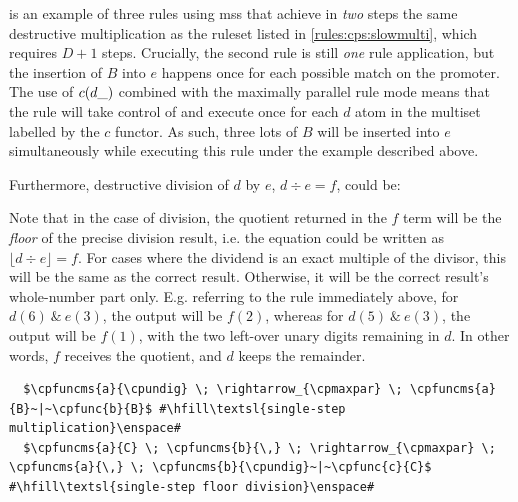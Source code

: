  is an example of three rules using \glspl{ms} that achieve in \emph{two} steps the same destructive multiplication as the \gls{ruleset} listed in \cref{rules:cps:slowmulti}, which requires \(D + 1\) steps.  Crucially, the second rule is still \emph{one} rule application, but the insertion of \(B\) into \(e\) happens once for each possible match on the promoter.  The use of \(c(d\_)\) combined with the maximally parallel rule mode means that the rule will take control of and execute once for each \(d\) atom in the multiset labelled by the \(c\) functor.  As such, three lots of \(B\) will be inserted into \(e\) simultaneously while executing this rule under the example described above.



Furthermore, destructive division of \(d\) by \(e\), \(d \div e = f\), could be:

Note that in the case of division, the quotient returned in the \(f\) term will be the \emph{floor} of the precise division result, i.e. the equation could be written as \(\lfloor d \div e \rfloor = f\).  For cases where the dividend is an exact multiple of the divisor, this will be the same as the correct result.  Otherwise, it will be the correct result's whole-number part only.  E.g. referring to the rule immediately above, for \(d(6)~\&~e(3)\), the output will be \(f(2)\), whereas for \(d(5)~\&~e(3)\), the output will be \(f(1)\), with the two left-over unary digits remaining in \(d\).  In other words, \(f\) receives the quotient, and \(d\) keeps the remainder.

\lstset{xleftmargin=.5in, xrightmargin=.5in} 
\begin{lstlisting}
  $\cpfuncms{a}{\cpundig} \; \rightarrow_{\cpmaxpar} \; \cpfuncms{a}{B}~|~\cpfunc{b}{B}$ #\hfill\textsl{single-step multiplication}\enspace#
  $\cpfuncms{a}{C} \; \cpfuncms{b}{\,} \; \rightarrow_{\cpmaxpar} \; \cpfuncms{a}{\,} \; \cpfuncms{b}{\cpundig}~|~\cpfunc{c}{C}$ #\hfill\textsl{single-step floor division}\enspace#
\end{lstlisting}

